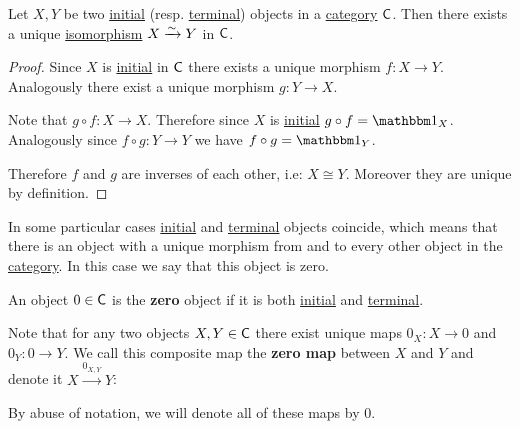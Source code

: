 \documentclass[../../main]{subfiles}
\begin{document}
\begin{proposition}\label{prop:uniqueness-initial-terminal-objects}
  Let \(X, Y\) be two \hyperref[def:initial-terminal-object]{initial} (resp. \hyperref[def:initial-terminal-object]{terminal}) objects in a \hyperref[def:category]{category} \(\mathsf{C}\).
  Then there exists a unique \hyperref[def:categorical-isomorphism]{isomorphism} \(X \xrightarrow{\sim} Y\) in \(\mathsf{C}\).
\end{proposition}
\begin{proof}
  Since \(X\) is \hyperref[def:initial-terminal-object]{initial} in \(\mathsf{C}\) there exists a unique morphism \(f\colon X \to Y\).
  Analogously there exist a unique morphism \(g\colon Y \to X\).

  Note that \(g \circ f\colon X \to X\).
  Therefore since \(X\) is \hyperref[def:initial-terminal-object]{initial} \(g \circ f = \id_{X}\).
  Analogously since \(f \circ g: Y \to Y\) we have \(f \circ g = \id_{Y}\).

  Therefore \(f\) and \(g\) are inverses of each other, i.e: \(X \cong Y\).
  Moreover they are unique by definition.
\end{proof}

In some particular cases \hyperref[def:initial-terminal-object]{initial} and \hyperref[def:initial-terminal-object]{terminal} objects coincide, which means that there is an object with a unique morphism from and to every other object in the \hyperref[def:category]{category}.
In this case we say that this object is zero.

\begin{definition}\label{def:zero-object}
  An object \(0 \in \mathsf{C}\) is the \textbf{zero} object if it is both \hyperref[def:initial-terminal-object]{initial} and \hyperref[def:initial-terminal-object]{terminal}.

  Note that for any two objects \(X, Y \in \mathsf{C}\) there exist unique maps \(0_{X}\colon X \to 0\) and \(0_{Y}\colon 0 \to Y\).
  We call this composite map the \textbf{zero map} between \(X\) and \(Y\) and denote it \(X \xrightarrow{0_{X, Y}} Y\):
  \begin{center}
  \end{center}

  By abuse of notation, we will denote all of these maps by \(0\).
\end{definition}
\end{document}
